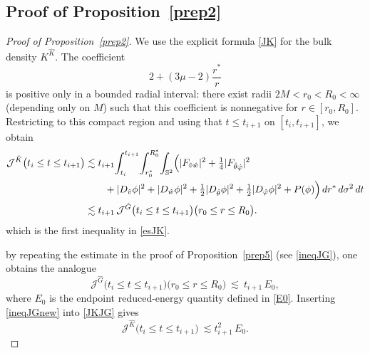 \documentclass[11pt]{article}
\numberwithin{equation}{section}
\theoremstyle{plain}
\theoremstyle{definition}
\theoremstyle{remark}
\begin{document}
\subsection{Proof of Proposition~\ref{prep2}}
\label{app:proof-prep2}

\begin{proof}[Proof of Proposition~\ref{prep2}]
We use the explicit formula \eqref{JK} for the bulk density $K^{\hat K}$.
The coefficient
\begin{equation}
2+(3\mu-2)\frac{r^{\ast}}{r}
\end{equation}
is positive only in a bounded radial interval: there exist radii $2M<r_{0}<R_{0}<\infty$ (depending only on $M$) such that this coefficient is nonnegative for $r\in[r_{0},R_{0}]$.
Restricting to this compact region and using that $t\le t_{i+1}$ on $[t_i,t_{i+1}]$, we obtain
\begin{eqnarray}\label{JKJG}
\mathcal{J}^{\hat{K}}\bigl(t_{i}\le t\le t_{i+1}\bigr)
&\lesssim
t_{i+1}\!
\int_{t_{i}}^{t_{i+1}}\!\int_{r_{0}^{\ast}}^{R_{0}^{\ast}}\!\int_{\mathbb S^{2}}
\Bigl(
|F_{\hat v\hat w}|^{2}+\tfrac14|F_{\hat\theta\hat\varphi}|^{2}
\nonumber\\
&\qquad
+|D_{\hat v}\phi|^{2}+|D_{\hat w}\phi|^{2}
+\tfrac12|D_{\hat\theta}\phi|^{2}+\tfrac12|D_{\hat\varphi}\phi|^{2}
+P(\phi)
\Bigr)\,dr^{\ast}\,d\sigma^{2}\,dt
\nonumber\\
&\lesssim
t_{i+1}\,
\mathcal{J}^{\hat{G}}\bigl(t_{i}\le t\le t_{i+1}\bigr)\bigl(r_{0}\le r\le R_{0}\bigr).
\end{eqnarray}
which is the first inequality in \eqref{esJK}.

\medskip
by repeating the estimate in the proof of Proposition~\ref{prep5} (see \eqref{ineqJG}), one obtains the analogue
\begin{equation}\label{ineqJGnew}
\mathcal{J}^{\hat{G}}\bigl(t_{i}\le t\le t_{i+1}\bigr)\bigl(r_{0}\le r\le R_{0}\bigr)
\ \lesssim\ t_{i+1}\,E_{0},
\end{equation}
where $E_{0}$ is the endpoint reduced-energy quantity defined in \eqref{E0}.
Inserting \eqref{ineqJGnew} into \eqref{JKJG} gives
\begin{equation}\label{es1}
\mathcal{J}^{\hat{K}}\bigl(t_{i}\le t\le t_{i+1}\bigr)
\ \lesssim
t_{i+1}^{2}\,E_{0}.
\end{equation}


\end{proof}
\end{document}
